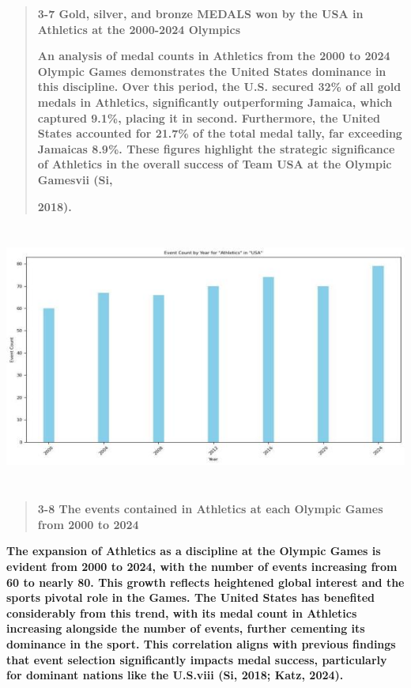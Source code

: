 \documentclass[12pt,a4paper]{article}
\renewenvironment{quote}{\begin{quotation}}{\end{quotation}}  %
\begin{document}
    \begin{quote}
    \textbf{3-7 Gold, silver, and bronze MEDALS won by the USA in Athletics
    at the 2000-2024 Olympics}
    
    \textbf{An analysis of medal counts in Athletics from the 2000 to 2024
    Olympic Games demonstrates the United States\textquotesingle{} dominance
    in this discipline. Over this period, the U.S. secured 32\% of all gold
    medals in Athletics, significantly outperforming Jamaica, which captured
    9.1\%, placing it in second. Furthermore, the United States accounted
    for 21.7\% of the total medal tally, far exceeding
    Jamaica\textquotesingle s 8.9\%. These figures highlight the strategic
    significance of Athletics in the overall success of Team USA at the
    Olympic Gamesvii (Si,}
    
    \textbf{2018).}
    \end{quote}
    
    \includegraphics[width=6.30167in,height=3.44333in]{./media/media/image16.jpeg}
    
    \begin{quote}
    \textbf{3-8 The events contained in Athletics at each Olympic Games from
    2000 to 2024}
    \end{quote}
    
    \textbf{The expansion of Athletics as a discipline at the Olympic Games
    is evident from 2000 to 2024, with the number of events increasing from
    60 to nearly 80. This growth reflects heightened global interest and the
    sport\textquotesingle s pivotal role in the Games. The United States has
    benefited considerably from this trend, with its medal count in
    Athletics increasing alongside the number of events, further cementing
    its dominance in the sport. This correlation aligns with previous
    findings that event selection significantly impacts medal success,
    particularly for dominant nations like the U.S.viii (Si, 2018; Katz,
    2024).}
    
\end{document}
